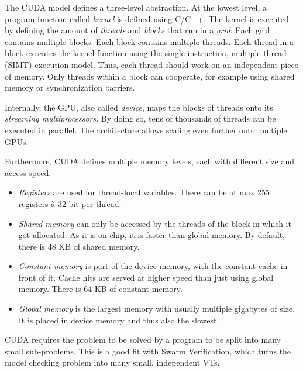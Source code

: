 \documentclass[
fancyheadings, %
%
%
]{stsreprt}
\begin{document}
The CUDA model defines a three-level abstraction.
At the lowest level, a program function called \emph{kernel} is defined using C/C++.
The kernel is executed by defining the amount of \emph{threads} and \emph{blocks} that run in a \emph{grid}:
Each grid contains multiple blocks.
Each block contains multiple threads.
Each thread in a block executes the kernel function using the single instruction, multiple thread (SIMT) execution model.
Thus, each thread should work on an independent piece of memory.
Only threads within a block can cooperate, for example using shared memory or synchronization barriers.

Internally, the GPU, also called \emph{device}, maps the blocks of threads onto its \emph{streaming multiprocessors}.
By doing so, tens of thousands of threads can be executed in parallel.
The architecture allows scaling even further onto multiple GPUs.

Furthermore, CUDA defines multiple memory levels, each with different size and access speed.

\begin{itemize}
    \item \emph{Registers} are used for thread-local variables.
          There can be at max 255 registers à 32 bit per thread.


    \item \emph{Shared memory} can only be accessed by the threads of the block in which it got allocated.
          As it is on-chip, it is faster than global memory.
          By default, there is 48 KB of shared memory.

    \item \emph{Constant memory} is part of the device memory, with the constant cache in front of it.
          Cache hits are served at higher speed than just using global memory.
          There is 64 KB of constant memory.


    \item \emph{Global memory} is the largest memory with usually multiple gigabytes of size.
          It is placed in device memory and thus also the slowest.
\end{itemize}

CUDA requires the problem to be solved by a program to be split into many small sub-problems.
This is a good fit with Swarm Verification, which turns the model checking problem into many small, independent VTs.
\end{document}
